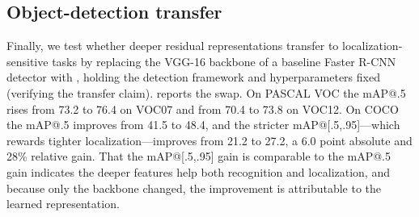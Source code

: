 \subsection{Object-detection transfer}
\label{sec:exp:detection}
Finally, we test whether deeper residual representations transfer to localization-sensitive
tasks by replacing the VGG-16 backbone of a baseline Faster R-CNN detector with ,
holding the detection framework and hyperparameters fixed (verifying the transfer claim).
 reports the swap. On PASCAL VOC the mAP@.5 rises from 73.2 to 76.4 on
VOC07 and from 70.4 to 73.8 on VOC12. On COCO the mAP@.5 improves from 41.5 to 48.4, and the
stricter mAP@[.5,.95]---which rewards tighter localization---improves from 21.2 to 27.2, a 6.0
point absolute and 28\% relative gain. That the mAP@[.5,.95] gain is comparable to the
mAP@.5 gain indicates the deeper features help both recognition and localization, and because
only the backbone changed, the improvement is attributable to the learned representation.





